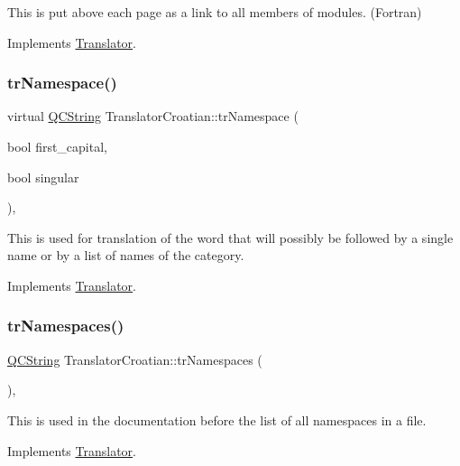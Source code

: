 This is put above each page as a link to all members of modules. (Fortran) 

Implements \mbox{\hyperlink{class_translator}{Translator}}.

\mbox{\label{class_translator_croatian_ab74e2ae74b6acaec10f1cb15f6bb5c4f}} 
\subsubsection{\texorpdfstring{trNamespace()}{trNamespace()}}
{\footnotesize\ttfamily virtual \mbox{\hyperlink{class_q_c_string}{Q\+C\+String}} Translator\+Croatian\+::tr\+Namespace (\begin{DoxyParamCaption}\item[{bool}]{first\+\_\+capital,  }\item[{bool}]{singular }\end{DoxyParamCaption})\hspace{0.3cm}{\ttfamily [inline]}, {\ttfamily [virtual]}}

This is used for translation of the word that will possibly be followed by a single name or by a list of names of the category. 

Implements \mbox{\hyperlink{class_translator}{Translator}}.

\mbox{\label{class_translator_croatian_adc337ec4e3e306ad6159ac42c56ee436}} 
\subsubsection{\texorpdfstring{trNamespaces()}{trNamespaces()}}
{\footnotesize\ttfamily \mbox{\hyperlink{class_q_c_string}{Q\+C\+String}} Translator\+Croatian\+::tr\+Namespaces (\begin{DoxyParamCaption}{ }\end{DoxyParamCaption})\hspace{0.3cm}{\ttfamily [inline]}, {\ttfamily [virtual]}}

This is used in the documentation before the list of all namespaces in a file. 

Implements \mbox{\hyperlink{class_translator}{Translator}}.

